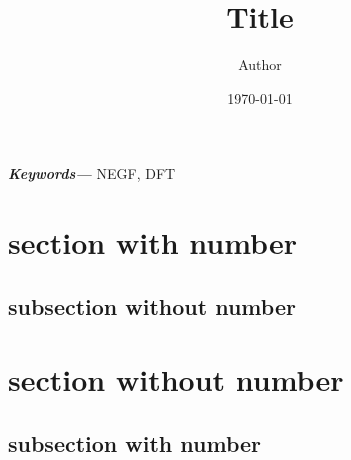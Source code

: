\documentclass{article}
\title{Title}
\author{Author}
\date{\today}
\providecommand{\keywords}[1]{\small\textbf{\textit{Keywords---}} #1}
\begin{document}
\maketitle

\begin{abstract}
    \lipsum[66]
\end{abstract}

\keywords{NEGF, DFT}

\tableofcontents

\section{section with number}

\lipsum[75]

\subsection*{subsection without number}

\lipsum[67]

\section{section without number}

\lipsum[23]

\subsection{subsection with number}

\lipsum[24]
\end{document}
